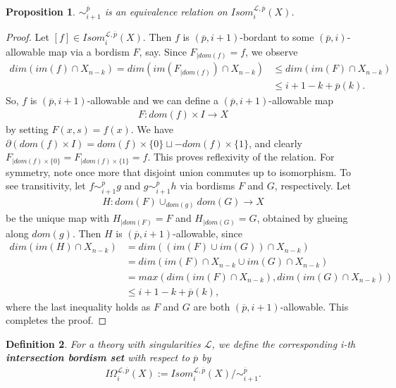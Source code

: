 \documentclass{scrreprt}
\newtheorem{prop}{Proposition}[chapter]
\newtheorem{definition}[prop]{Definition}
\begin{document}
\begin{prop}\label{intersectioneqrelation}
$\sim_{i+1}^{\overline{p}}$ is an equivalence relation on $Isom_i^{\mathcal{L}, \overline{p}}(X)$.
\end{prop}

\begin{proof}
Let $[f] \in Isom_i^{\mathcal{L}, \overline{p}}(X)$. Then $f$ is $(\overline{p},i+1)$-bordant to some $(\overline{p},i)$-allowable map via a bordism $F$, say. Since $F_{|dom(f)}=f$, we observe
\begin{align*}
dim(im(f) \cap X_{n-k}) = dim(im(F_{|dom(f)}) \cap X_{n-k}) &\leq dim(im(F) \cap X_{n-k}) \\ &\leq i+1-k+ \overline{p}(k).
\end{align*}
So, $f$ is $(\overline{p},i+1)$-allowable and we can define a $(\overline{p},i+1)$-allowable map \begin{align*}
F: dom(f) \times I \to X
\end{align*} by setting $F(x,s)=f(x)$. We have $\partial(dom(f) \times I)= dom(f) \times \{ 0 \} \sqcup -dom(f) \times \{  1 \}$, and clearly $F_{|dom(f) \times \{  0 \} }=F_{|dom(f) \times \{  1 \} } = f$. This proves reflexivity of the relation. For symmetry, note once more that disjoint union commutes up to isomorphism. To see transitivity, let $f \sim_{i+1}^{\overline{p}} g$ and $g \sim_{i+1}^{\overline{p}} h$ via bordisms $F$ and $G$, respectively. Let
\begin{align*}
H: dom(F) \cup_{dom(g)} dom(G) \to X
\end{align*}
be the unique map with $H_{|dom(F)}=F$ and $H_{|dom(G)}=G$, obtained by glueing along $dom(g)$. Then $H$ is $(\overline{p},i+1)$-allowable, since
\begin{align*}
dim(im(H) \cap X_{n-k}) &= dim((im(F) \cup im(G)) \cap X_{n-k})\\ & = dim(im(F) \cap X_{n-k} \cup im(G) \cap X_{n-k}) \\ &= max(dim(im(F) \cap X_{n-k}), dim(im(G) \cap X_{n-k})) \\ &\leq i+1-k+ \overline{p}(k),
\end{align*}
where the last inequality holds as $F$ and $G$ are both $(\overline{p},i+1)$-allowable. This completes the proof.
\end{proof}

\begin{definition}
For a theory with singularities $\mathcal{L}$, we define the corresponding i-th \textbf{intersection bordism set} with respect to $\overline{p}$ by 
\begin{align*}
I \Omega_i^{\mathcal{L}, \overline{p}}(X) := Isom_i^{\mathcal{L}, \overline{p}}(X)/ \sim_{i+1}^{\overline{p}} .
\end{align*}
\end{definition}
\end{document}
